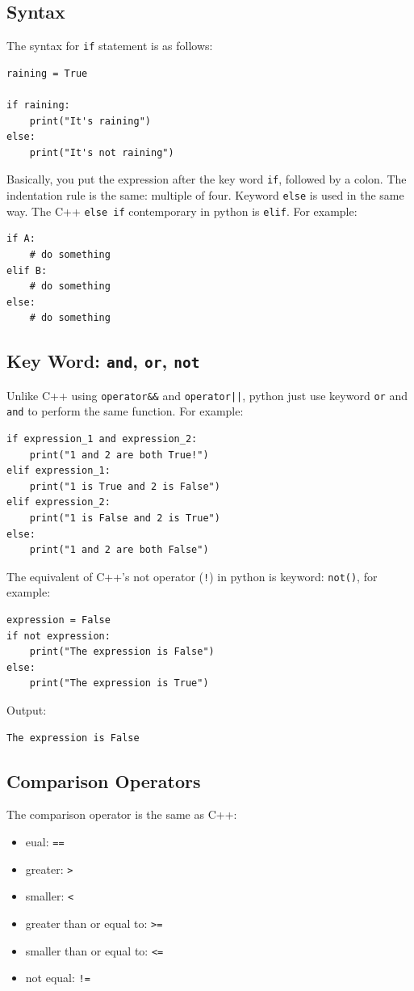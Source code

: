 \documentclass[12pt]{book}
\begin{document}
\subsection{Syntax}
\label{sec:org5a56824}
The syntax for \texttt{if} statement is as follows:
\begin{verbatim}
raining = True

if raining:
    print("It's raining")
else:
    print("It's not raining")
\end{verbatim}
Basically, you put the expression after the key word \texttt{if}, followed by a colon. The indentation rule is the same: multiple of four. Keyword \texttt{else} is used in the same way. The C++ \texttt{else if} contemporary in python is \texttt{elif}. For example:
\begin{verbatim}
if A:
    # do something
elif B:
    # do something
else:
    # do something
\end{verbatim}
\subsection{Key Word: \texttt{and}, \texttt{or}, \texttt{not}}
\label{sec:orgc5e92a1}
Unlike C++ using \texttt{operator\&\&} and \texttt{operator||}, python just use keyword \texttt{or} and \texttt{and} to perform the same function. For example:
\begin{verbatim}
if expression_1 and expression_2:
    print("1 and 2 are both True!")
elif expression_1:
    print("1 is True and 2 is False")
elif expression_2:
    print("1 is False and 2 is True")
else:
    print("1 and 2 are both False")
\end{verbatim}

The equivalent of C++'s not operator (\texttt{!}) in python is keyword: \texttt{not()}, for example:
\begin{verbatim}
expression = False
if not expression:
    print("The expression is False")
else:
    print("The expression is True")
\end{verbatim}
Output:
\begin{verbatim}
The expression is False
\end{verbatim}
\subsection{Comparison Operators}
\label{sec:orgbd79c91}
The comparison operator is the same as C++:
\begin{itemize}
\item eual: \texttt{==}
\item greater: \texttt{>}
\item smaller: \texttt{<}
\item greater than or equal to: \texttt{>=}
\item smaller than or equal to: \texttt{<=}
\item not equal: \texttt{!=}
\end{itemize}
\end{document}
